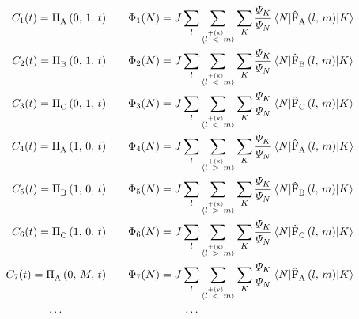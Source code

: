 \begin{equation}
    \label{eq:psi-and-c-choices}
    \begin{split}
        C_1(t) = \VhamiltonianAnalyticalPartIntegrated{A}{0}{1}{t}
        \quad &\quad
        \Phi_1(N) = J \lsum[l] \lsum[\biggerNeighborX{l}{m}] 
        \lsum[K] \frac{\psiN[K]}{\psiN}
            \bracketHelper{N}{
                \VhamiltonianOperatorPart{A}{l}{m} 
            }{K}\\
        C_2(t) = \VhamiltonianAnalyticalPartIntegrated{B}{0}{1}{t}
        \quad &\quad
        \Phi_2(N) = J \lsum[l] \lsum[\biggerNeighborX{l}{m}] 
        \lsum[K] \frac{\psiN[K]}{\psiN}
            \bracketHelper{N}{
                \VhamiltonianOperatorPart{B}{l}{m} 
            }{K}\\
        C_3(t) = \VhamiltonianAnalyticalPartIntegrated{C}{0}{1}{t}
        \quad &\quad
        \Phi_3(N) = J \lsum[l] \lsum[\biggerNeighborX{l}{m}] 
        \lsum[K] \frac{\psiN[K]}{\psiN}
            \bracketHelper{N}{
                \VhamiltonianOperatorPart{C}{l}{m} 
            }{K}\\
        C_4(t) = \VhamiltonianAnalyticalPartIntegrated{A}{1}{0}{t}
        \quad &\quad
        \Phi_4(N) = J \lsum[l] \lsum[\smallerNeighborX{l}{m}] 
        \lsum[K] \frac{\psiN[K]}{\psiN}
            \bracketHelper{N}{
                \VhamiltonianOperatorPart{A}{l}{m} 
            }{K}\\
        C_5(t) = \VhamiltonianAnalyticalPartIntegrated{B}{1}{0}{t}
        \quad &\quad
        \Phi_5(N) = J \lsum[l] \lsum[\smallerNeighborX{l}{m}] 
        \lsum[K] \frac{\psiN[K]}{\psiN}
            \bracketHelper{N}{
                \VhamiltonianOperatorPart{B}{l}{m} 
            }{K}\\
        C_6(t) = \VhamiltonianAnalyticalPartIntegrated{C}{1}{0}{t}
        \quad &\quad
        \Phi_6(N) = J \lsum[l] \lsum[\smallerNeighborX{l}{m}] 
        \lsum[K] \frac{\psiN[K]}{\psiN}
            \bracketHelper{N}{
                \VhamiltonianOperatorPart{C}{l}{m} 
            }{K}\\
        C_7(t) = \VhamiltonianAnalyticalPartIntegrated{A}{0}{M}{t}
        \quad &\quad
        \Phi_7(N) = J \lsum[l] \lsum[\biggerNeighborY{l}{m}] 
        \lsum[K] \frac{\psiN[K]}{\psiN}
            \bracketHelper{N}{
                \VhamiltonianOperatorPart{A}{l}{m} 
            }{K}\\
        \cdots\quad \quad \quad\quad \quad &\quad\quad \quad\quad\quad \quad \cdots
    \end{split}
\end{equation}

